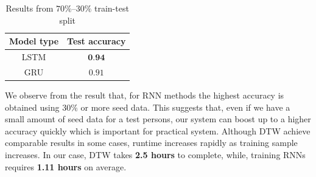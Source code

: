 \documentclass[10pt,twocolumn,letterpaper]{article}
\begin{document}
\begin{table}[h]
	\begin{center}
		\begin{tabular}{|c|c|}
			\hline
			Model type & Test accuracy\\
			\hline\hline
			LSTM & $\textbf{0.94}$\\
			\hline
			GRU & $0.91$\\
			\hline
		\end{tabular}
	\end{center}
	\caption{Results from $70\%$--$30\%$ train-test split}
	\label{table:result_conv}
\end{table}
%		
We observe from the result that, for RNN methods the highest accuracy is obtained using $30\%$ or more seed data. This suggests that, even if we have a small amount of seed data for a test persons, our system can boost up to a higher accuracy quickly which is important for practical system. 
Although DTW achieve comparable results in some cases, runtime increases rapidly as training sample increases. In our case, DTW takes \textbf{2.5 hours} to complete, while, training RNNs requires \textbf{1.11 hours} on average.
\end{document}
